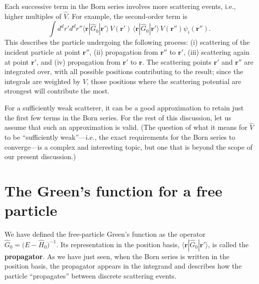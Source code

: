 \documentclass[pra,12pt]{revtex4}
\begin{document}
Each successive term in the Born series involves more scattering
events, i.e., higher multiples of $\hat{V}$.  For example, the
second-order term is
\begin{equation*}
  \int d^dr' d^dr'' \langle \mathbf{r} | \hat{G}_0 |\mathbf{r}'\rangle\, V(\mathbf{r}') \, \langle \mathbf{r} | \hat{G}_0 |\mathbf{r}'\rangle \, V(\mathbf{r}'') \psi_i(\mathbf{r}'').
\end{equation*}
This describes the particle undergoing the following process: (i)
scattering of the incident particle at point $\mathbf{r}''$, (ii)
propagation from $\mathbf{r}''$ to $\mathbf{r}'$, (iii) scattering
again at point $\mathbf{r}'$, and (iv) propagation from $\mathbf{r}'$
to $\mathbf{r}$.  The scattering points $\mathbf{r}'$ and
$\mathbf{r}''$ are integrated over, with all possible positions
contributing to the result; since the integrals are weighted by $V$,
those positions where the scattering potential are strongest will
contribute the most.

For a sufficiently weak scatterer, it can be a good approximation to
retain just the first few terms in the Born series.  For the rest of
this discussion, let us assume that such an approximation is valid.
(The question of what it means for $\hat{V}$ to be ``sufficiently
weak''---i.e., the exact requirements for the Born series to
converge---is a complex and interesting topic, but one that is beyond
the scope of our present discussion.)

\section{The Green's function for a free particle}
\label{sec:freegreen}

We have defined the free-particle Green's function as the operator
$\hat{G}_0=\big(E-\hat{H}_0\big)^{-1}$.  Its representation in the
position basis, $\langle\mathbf{r}|\hat{G}_0|\mathbf{r}'\rangle$, is
called the \textbf{propagator}.  As we have just seen, when the Born
series is written in the position basis, the propagator appears in the
integrand and describes how the particle ``propagates'' between
discrete scattering events.
\end{document}
